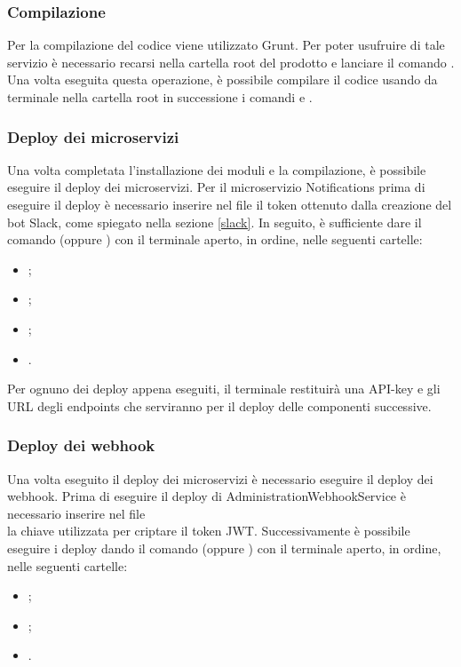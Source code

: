 \subsubsection{Compilazione}
Per la compilazione del codice viene utilizzato Grunt. Per poter usufruire di tale servizio è necessario recarsi nella cartella root del prodotto e lanciare il comando .
Una volta eseguita questa operazione, è possibile compilare il codice usando da terminale nella cartella root in successione i comandi  e .

\subsubsection{Deploy dei microservizi}\label{deploy-micro}
Una volta completata l'installazione dei moduli e la compilazione, è possibile eseguire il deploy dei microservizi. Per il microservizio Notifications prima di eseguire il deploy è necessario inserire nel file  il token ottenuto dalla creazione del bot Slack, come spiegato nella sezione \ref{slack}.
In seguito, è sufficiente dare il comando  (oppure ) con il terminale aperto, in ordine, nelle seguenti cartelle:
\begin{itemize}
	\item {};
	\item {};
	\item {};
	\item {}.
\end{itemize}
Per ognuno dei deploy appena eseguiti, il terminale restituirà una API-key e gli URL degli endpoints che serviranno per il deploy delle componenti successive.

\subsubsection{Deploy dei webhook}
Una volta eseguito il deploy dei microservizi è necessario eseguire il deploy dei webhook. Prima di eseguire il deploy di AdministrationWebhookService è necessario  inserire nel file  \\  la chiave utilizzata per criptare il token JWT. Successivamente è possibile eseguire i deploy dando il comando  (oppure ) con il terminale aperto, in ordine, nelle seguenti cartelle:
\begin{itemize}
	\item {};
	\item {};
	\item {}.
\end{itemize}

